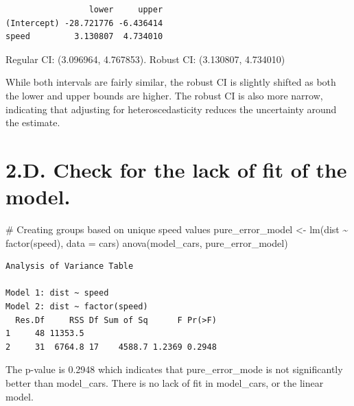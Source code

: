 \documentclass[
  letterpaper,
  DIV=11,
  numbers=noendperiod]{scrartcl}
\newenvironment{Shaded}{\begin{snugshade}}{\end{snugshade}}
\newcommand{\AttributeTok}[1]{\textcolor[rgb]{0.40,0.45,0.13}{#1}}
\newcommand{\CommentTok}[1]{\textcolor[rgb]{0.37,0.37,0.37}{#1}}
\newcommand{\FunctionTok}[1]{\textcolor[rgb]{0.28,0.35,0.67}{#1}}
\newcommand{\NormalTok}[1]{\textcolor[rgb]{0.00,0.23,0.31}{#1}}
\newcommand{\OtherTok}[1]{\textcolor[rgb]{0.00,0.23,0.31}{#1}}
\newcommand{\SpecialCharTok}[1]{\textcolor[rgb]{0.37,0.37,0.37}{#1}}
\begin{document}
\begin{verbatim}
                 lower     upper
(Intercept) -28.721776 -6.436414
speed         3.130807  4.734010
\end{verbatim}

Regular CI: (3.096964, 4.767853). Robust CI: (3.130807, 4.734010)

While both intervals are fairly similar, the robust CI is slightly
shifted as both the lower and upper bounds are higher. The robust CI is
also more narrow, indicating that adjusting for heteroscedasticity
reduces the uncertainty around the estimate.

\hypertarget{d.-check-for-the-lack-of-fit-of-the-model.}{%
\section{2.D. Check for the lack of fit of the
model.}\label{d.-check-for-the-lack-of-fit-of-the-model.}}

\begin{Shaded}
\begin{Highlighting}[]
\CommentTok{\# Creating groups based on unique speed values}
\NormalTok{pure\_error\_model }\OtherTok{\textless{}{-}} \FunctionTok{lm}\NormalTok{(dist }\SpecialCharTok{\textasciitilde{}} \FunctionTok{factor}\NormalTok{(speed), }\AttributeTok{data =}\NormalTok{ cars)}
\FunctionTok{anova}\NormalTok{(model\_cars, pure\_error\_model)}
\end{Highlighting}
\end{Shaded}

\begin{verbatim}
Analysis of Variance Table

Model 1: dist ~ speed
Model 2: dist ~ factor(speed)
  Res.Df     RSS Df Sum of Sq      F Pr(>F)
1     48 11353.5                           
2     31  6764.8 17    4588.7 1.2369 0.2948
\end{verbatim}

The p-value is 0.2948 which indicates that pure\_error\_mode is not
significantly better than model\_cars. There is no lack of fit in
model\_cars, or the linear model.
\end{document}
